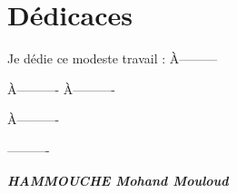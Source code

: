 \chapter*{Dédicaces}
\thispagestyle{empty}
\begin{it}

\begin{flushleft}
Je dédie ce modeste travail :\newline
\newline
À---------\newline
\newline

À----------\newline
\newline
À----------\newline
\newline

À----------\newline
\newline

----------


\begin{flushright}
\textbf{\textit{HAMMOUCHE Mohand Mouloud}}
\end{flushright}
\end{flushleft}
\end{it}